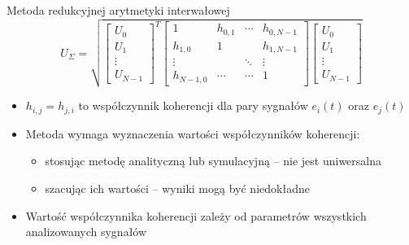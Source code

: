 \documentclass[12pt, polish, aspectratio = 169]{beamer}
\begin{document}
\begin{frame}{Metoda redukcyjnej arytmetyki interwałowej}
\begin{equation}
U_{\Sigma} = \sqrt{
\begin{bmatrix}
U_{0} \\ U_{1} \\ \vdots \\ U_{N-1}
\end{bmatrix}^{T}
\begin{bmatrix}
1         & h_{0,1} & \cdots & h_{0,N-1} \\
h_{1,0}   & 1       &        & h_{1,N-1} \\
\vdots    &         & \ddots & \vdots    \\
h_{N-1,0} & \cdots  & \cdots & 1
\end{bmatrix}
\begin{bmatrix}
U_{0} \\ U_{1} \\ \vdots \\ U_{N-1}
\end{bmatrix}}
\label{eq:unc_matrix}
\end{equation}
\begin{itemize}
\item $h_{i,j} = h_{j,i}$ to współczynnik koherencji dla pary sygnałów $e_{i}(t)$ oraz $e_{j}(t)$
\item Metoda wymaga wyznaczenia wartości współczynników koherencji:
	\begin{itemize}
	\item stosując metodę analityczną lub symulacyjną -- nie jest uniwersalna
	\item szacując ich wartości -- wyniki mogą być niedokładne
	\end{itemize}
\item Wartość współczynnika koherencji zależy od parametrów wszystkich analizowanych sygnałów
\end{itemize}
\end{frame}
\end{document}
